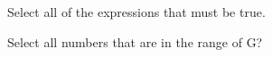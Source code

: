 \documentclass{ximera}
\begin{document}
\begin{exercise}
Select all of the expressions that must be true. 

\begin{selectAll}
\end{selectAll}

\end{exercise}





\begin{exercise}
Select all numbers that are in the range of G?

\begin{selectAll}
\end{selectAll}

\end{exercise}
\end{document}
